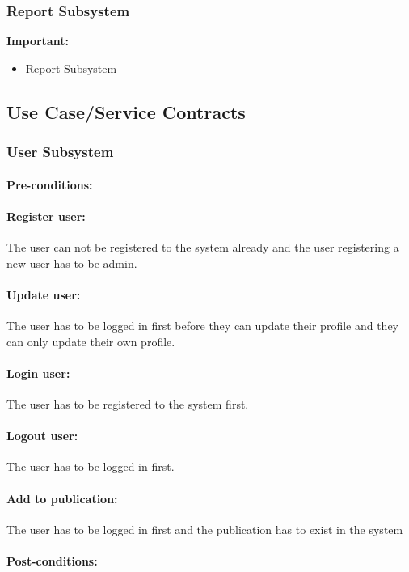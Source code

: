 \documentclass{article}
\begin{document}
		\subsubsection{Report Subsystem}
			\textbf{Important:}
			\begin{itemize}
				\item Report Subsystem
			\end{itemize}
			
	\subsection{Use Case/Service Contracts}
		\subsubsection{User Subsystem}
			\paragraph{Pre-conditions:}
			\paragraph{Register user:} The user can not be registered to the system already and the user registering a new user has to be admin.
			\paragraph{Update user:} The user has to be logged in first before they can update their profile and they can only update their own profile.
			\paragraph{Login user:} The user has to be registered to the system first.
			\paragraph{Logout user:} The user has to be logged in first.
			\paragraph{Add to publication:} The user has to be logged in first and the publication has to exist in the system
			\paragraph{Post-conditions:}
\end{document}
